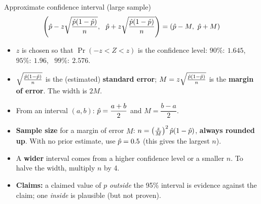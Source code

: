 \begin{keyres}{Approximate confidence interval (large sample)}
\[\left(\phat-z\sqrt{\frac{\phat(1-\phat)}{n}},\ \ \phat+z\sqrt{\frac{\phat(1-\phat)}{n}}\right)=(\phat-M,\ \phat+M)\]
\begin{cols}
\begin{itemize}
  \item $z$ is chosen so that $\Pr(-z<Z<z)$ is the confidence level: $90\%:\ 1.645$, \ $95\%:\ 1.96$, \ $99\%:\ 2.576$.
  \item $\sqrt{\frac{\hat{p}(1-\hat{p})}{n}}$ is the (estimated) \textbf{standard error}; $M=z\sqrt{\frac{\hat{p}(1-\hat{p})}{n}}$ is the \textbf{margin of error}. The width is $2M$.
  \item From an interval $(a,b)$: $\hat{p}=\dfrac{a+b}{2}$ and $M=\dfrac{b-a}{2}$.
\end{itemize}
\nextcol
\begin{itemize}
  \item \textbf{Sample size} for a margin of error $M$: $n=\left(\frac zM\right)^2\hat{p}(1-\hat{p})$, \textbf{always rounded up}. With no prior estimate, use $\hat{p}=0.5$ (this gives the largest $n$).
  \item A \textbf{wider} interval comes from a higher confidence level or a smaller $n$. To halve the width, multiply $n$ by 4.
  \item \textbf{Claims:} a claimed value of $p$ \emph{outside} the 95\% interval is evidence against the claim; one \emph{inside} is plausible (but not proven).
\end{itemize}
\end{cols}
\end{keyres}

